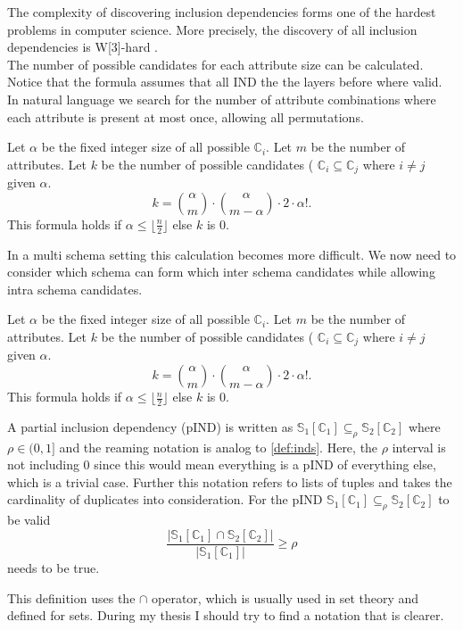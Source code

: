 
The complexity of discovering inclusion dependencies forms one of the hardest problems in computer science. More precisely, the discovery of all inclusion dependencies is W[3]-hard \cite{blasius2017parameterized}. \\ 

The number of possible candidates for each attribute size can be calculated. Notice that the formula assumes that all IND the the layers before where valid. In natural language we search for the number of attribute combinations where each attribute is present at most once, allowing all permutations.
\begin{definition}\label{def:candidates}
    Let $\alpha$ be the fixed integer size of all possible $\mathbb{C}_i$. Let $m$ be the number of attributes. Let $k$ be the number of possible candidates ( $\mathbb{C}_i \subseteq \mathbb{C}_j$ where $i \not = j$ given $\alpha$.
    $$
        k = \binom{\alpha}{m} \cdot \binom{\alpha}{m-\alpha} \cdot 2 \cdot \alpha!.
    $$
    This formula holds if $\alpha \leq \lfloor \frac{n}{2} \rfloor$ else $k$ is $0$.
\end{definition}
In a multi schema setting this calculation becomes more difficult. We now need to consider which schema can form which inter schema candidates while allowing intra schema candidates.
\begin{definition}\label{def:candidates-MS}
    Let $\alpha$ be the fixed integer size of all possible $\mathbb{C}_i$. Let $m$ be the number of attributes. Let $k$ be the number of possible candidates ( $\mathbb{C}_i \subseteq \mathbb{C}_j$ where $i \not = j$ given $\alpha$.
    $$
        k = \binom{\alpha}{m} \cdot \binom{\alpha}{m-\alpha} \cdot 2 \cdot \alpha!.
    $$
    This formula holds if $\alpha \leq \lfloor \frac{n}{2} \rfloor$ else $k$ is $0$.
\end{definition}

\begin{definition}\label{def:pinds}
    A partial inclusion dependency (pIND) is written as $\mathbb{S}_1[\mathbb{C}_1] \subseteq_{\rho} \mathbb{S}_2[\mathbb{C}_2]$ where $\rho \in (0, 1]$ and the reaming notation is analog to \ref{def:inds}. Here, the $\rho$ interval is not including $0$ since this would mean everything is a pIND of everything else, which is a trivial case. Further this notation refers to lists of tuples and takes the cardinality of duplicates into consideration. For the pIND $\mathbb{S}_1[\mathbb{C}_1] \subseteq_{\rho} \mathbb{S}_2[\mathbb{C}_2]$ to be valid
    $$
        \frac{|\mathbb{S}_1[\mathbb{C}_1] \cap \mathbb{S}_2[\mathbb{C}_2]|}
            {|\mathbb{S}_1[\mathbb{C}_1]|} \geq \rho
    $$
    needs to be true.
\end{definition}
This definition uses the $\cap$ operator, which is usually used in set theory and defined for sets. During my thesis I should try to find a notation that is clearer. \\

